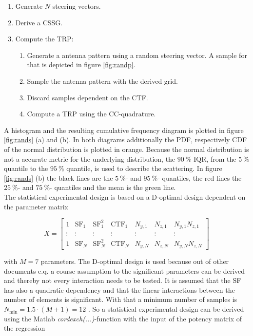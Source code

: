 \begin{enumerate}
\item Generate $N$ steering vectors.
\item Derive a \ac{CSSG}.
\item Compute the \ac{TRP}:
\begin{enumerate}
\item Generate a antenna pattern using a random steering vector. A sample for that is depicted in figure \ref{fig:randp}.
\item Sample the antenna pattern with the derived grid.
\item Discard samples dependent on the \ac{CTF}.
\item Compute a \ac{TRP} using the \ac{CC}-quadrature.
\end{enumerate}
\end{enumerate}

A histogram and the resulting cumulative frequency diagram is plotted in figure \ref{fig:rands} (a) and (b). In both diagrams additionally the \ac{PDF}, respectively \ac{CDF} of the normal distribution is plotted in orange. Because the normal distribution is not a accurate metric for the underlying distribution, the $\SI{90}{\percent}$ \ac{IQR}, from the $\SI{5}{\percent}$ quantile to the $\SI{95}{\percent}$ quantile, is used to describe the scattering. In figure \ref{fig:rands} (b) the black lines are the $\SI{5}{\percent}$- and $\SI{95}{\percent}$- quantiles, the red lines the $\SI{25}{\percent}$- and $\SI{75}{\percent}$- quantiles and the mean is the green line.\\
The statistical experimental design is based on a D-optimal design dependent on the parameter matrix

\begin{equation}
X = \begin{bmatrix}
1 & \text{SF}_1 & \text{SF}_1^2 & \text{CTF}_1 & N_{y,1} & N_{z,1} & N_{y,1}N_{z,1}\\
\vdots & \vdots & \vdots & \vdots & \vdots & \vdots & \vdots\\
1 & \text{SF}_N & \text{SF}_N^2 & \text{CTF}_N & N_{y,N} & N_{z,N} & N_{y,N}N_{z,N}
\end{bmatrix}
\label{eq:parammatrix}
\end{equation}

with $M=7$ parameters. The D-optimal design is used because out of other documents e.q. \cite{2018arXiv180310993F} a course assumption to the significant parameters can be derived and thereby not every interaction needs to be tested. It is assumed that the \ac{SF} has also a quadratic dependency and that the linear interactions between the number of elements is significant. With that a minimum number of samples is $N_\text{min}=1.5\cdot\left(M+1\right)=12$ \cite{dffs}. So a statistical experimental design can be derived using the Matlab\texttrademark{} \textit{cordexch(...)}-function with the input of the potency matrix of the regression

